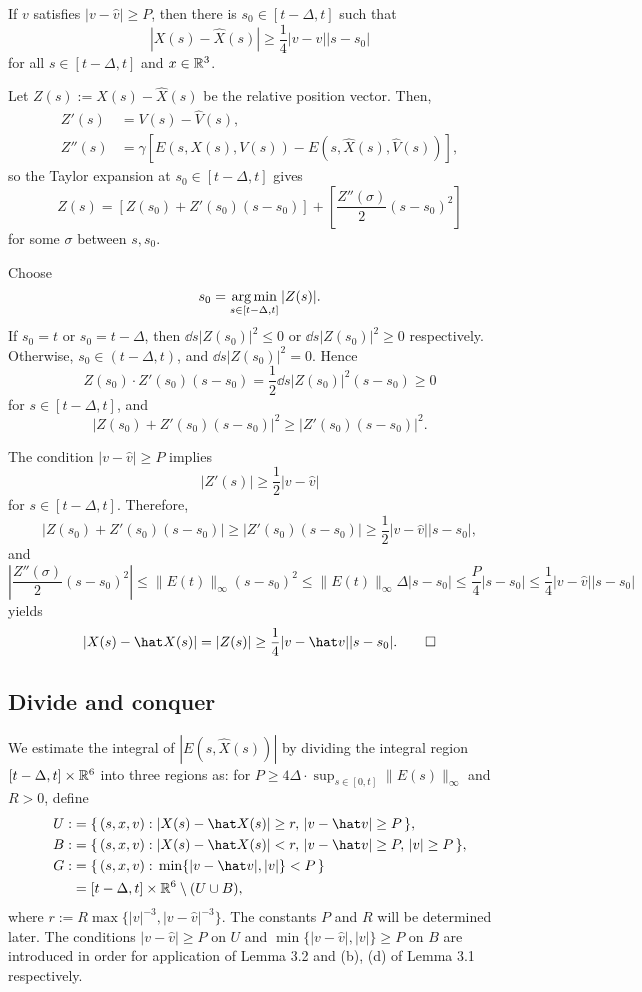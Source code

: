\documentclass{article}
\begin{document}
\begin{lem}
If $v$ satisfies $|v-\hat v|\ge P$, then there is $s_0\in[t-\Delta,t]$ such that
\[|X(s)-\hat X(s)|\ge\frac14|v-\hat v||s-s_0|\]
for all $s\in[t-\Delta,t]$ and $x\in\mathbb{R}^3$.
\end{lem}
\begin{pf}
Let $Z(s):=X(s)-\hat X(s)$ be the relative position vector.
Then,
\begin{align*}
Z'(s)&=V(s)-\hat V(s),\\
Z''(s)&=\gamma[E(s,X(s),V(s))-E(s,\hat X(s),\hat V(s))],
\end{align*}
so the Taylor expansion at $s_0\in[t-\Delta,t]$ gives
\[Z(s)=\left[Z(s_0)+Z'(s_0)(s-s_0)\right]+\left[\frac{Z''(\sigma)}2(s-s_0)^2\right]\]
for some $\sigma$ between $s,s_0$.

Choose
\[s_0=\operatorname*{arg\,min}_{s\in[t-\Delta,t]}|Z(s)|.\]
If $s_0=t$ or $s_0=t-\Delta$, then $\dd{s}|Z(s_0)|^2\le0$ or $\dd{s}|Z(s_0)|^2\ge0$ respectively.
Otherwise, $s_0\in(t-\Delta,t)$, and $\dd{s}|Z(s_0)|^2=0$.
Hence
\[Z(s_0)\cdot Z'(s_0)(s-s_0)=\frac12\dd{s}|Z(s_0)|^2(s-s_0)\ge0\]
for $s\in[t-\Delta,t]$, and
\[|Z(s_0)+Z'(s_0)(s-s_0)|^2\ge|Z'(s_0)(s-s_0)|^2.\]

The condition $|v-\hat v|\ge P$ implies
\[|Z'(s)|\ge\frac12|v-\hat v|\]
for $s\in[t-\Delta,t]$.
Therefore,
\[|Z(s_0)+Z'(s_0)(s-s_0)|\ge|Z'(s_0)(s-s_0)|\ge\frac12|v-\hat v||s-s_0|,\]
and
\[|\frac{Z''(\sigma)}2(s-s_0)^2|\le\|E(t)\|_\infty(s-s_0)^2
\le\|E(t)\|_\infty\Delta|s-s_0|\le\frac P4|s-s_0|
\le\frac14|v-\hat v||s-s_0|\]
yields
\[|X(s)-\hat X(s)|=|Z(s)|\ge\frac14|v-\hat v||s-s_0|.\qedhere\]
\end{pf}


\subsection{Divide and conquer}

We estimate the integral of $|E(s,\hat X(s))|$ by dividing the integral region $[t-\Delta,t]\times\mathbb{R}^6$ into three regions as:
for $P\ge4\Delta\cdot\sup_{s\in[0,t]}\|E(s)\|_\infty$ and $R>0$, define
\begin{align*}
U:&=\{\,(s,x,v):|X(s)-\hat X(s)|\ge r,\,|v-\hat v|\ge P\,\},\\
B:&=\{\,(s,x,v):|X(s)-\hat X(s)|<r,\,|v-\hat v|\ge P,\,|v|\ge P\,\},\\
G:&=\{\,(s,x,v):\,\min\{|v-\hat v|,|v|\}<P\,\}\\
&=[t-\Delta,t]\times\R^6\setminus(U\cup B),
\end{align*}
where $r:=R\max\{|v|^{-3},|v-\hat v|^{-3}\}$.
The constants $P$ and $R$ will be determined later.
The conditions $|v-\hat v|\ge P$ on $U$ and $\min\{|v-\hat v|,|v|\}\ge P$ on $B$ are introduced in order for application of Lemma 3.2 and (b), (d) of Lemma 3.1 respectively.
\end{document}
